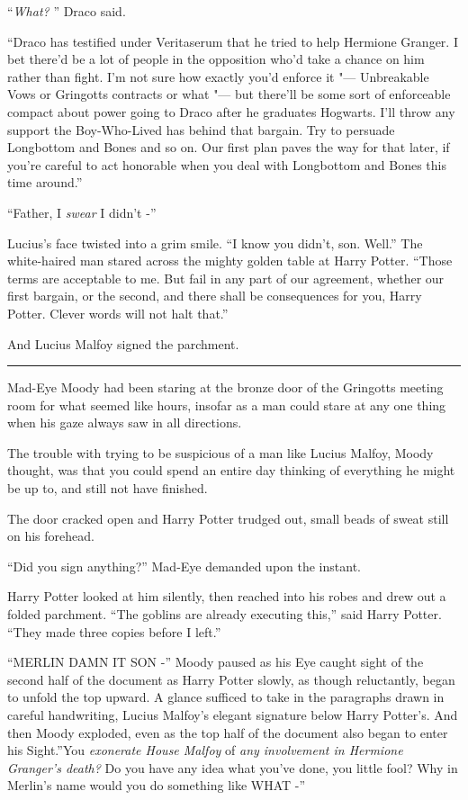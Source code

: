 ``\emph{What?} '' Draco said.

``Draco has testified under Veritaserum that he tried to help Hermione
Granger. I bet there'd be a lot of people in the opposition who'd take a
chance on him rather than fight. I'm not sure how exactly you'd enforce
it "--- Unbreakable Vows or Gringotts contracts or what "--- but there'll be
some sort of enforceable compact about power going to Draco after he
graduates Hogwarts. I'll throw any support the Boy-Who-Lived has behind
that bargain. Try to persuade Longbottom and Bones and so on. Our first
plan paves the way for that later, if you're careful to act honorable
when you deal with Longbottom and Bones this time around.''

``Father, I \emph{swear} I didn't -''

Lucius's face twisted into a grim smile. ``I know you didn't, son.
Well.'' The white-haired man stared across the mighty golden table at
Harry Potter. ``Those terms are acceptable to me. But fail in any part
of our agreement, whether our first bargain, or the second, and there
shall be consequences for you, Harry Potter. Clever words will not halt
that.''

And Lucius Malfoy signed the parchment.

\begin{center}\rule{3in}{0.4pt}\end{center}

Mad-Eye Moody had been staring at the bronze door of the Gringotts
meeting room for what seemed like hours, insofar as a man could stare at
any one thing when his gaze always saw in all directions.

The trouble with trying to be suspicious of a man like Lucius Malfoy,
Moody thought, was that you could spend an entire day thinking of
everything he might be up to, and still not have finished.

The door cracked open and Harry Potter trudged out, small beads of sweat
still on his forehead.

``Did you sign anything?'' Mad-Eye demanded upon the instant.

Harry Potter looked at him silently, then reached into his robes and
drew out a folded parchment. ``The goblins are already executing this,''
said Harry Potter. ``They made three copies before I left.''

``MERLIN DAMN IT SON -'' Moody paused as his Eye caught sight of the
second half of the document as Harry Potter slowly, as though
reluctantly, began to unfold the top upward. A glance sufficed to take
in the paragraphs drawn in careful handwriting, Lucius Malfoy's elegant
signature below Harry Potter's. And then Moody exploded, even as the top
half of the document also began to enter his Sight.''You \emph{exonerate
House Malfoy} of \emph{any involvement in Hermione Granger's death?} Do
you have any idea what you've done, you little fool? Why in Merlin's
name would you do something like WHAT -''

